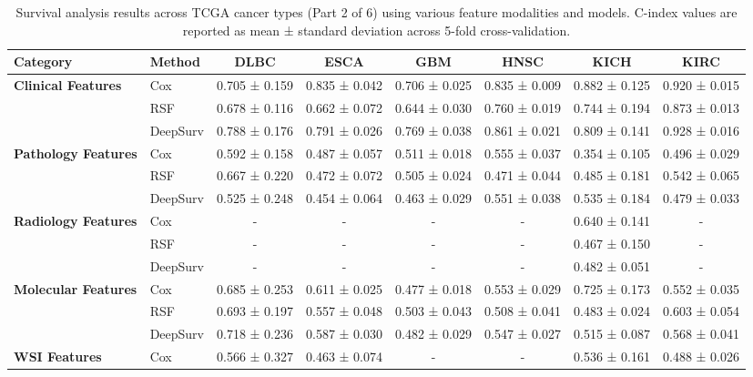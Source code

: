 \begin{sidewaystable}[htbp]
    \centering
    \caption{Survival analysis results across TCGA cancer types (Part 2 of 6) using various feature modalities and models. C-index values are reported as mean ± standard deviation across 5-fold cross-validation.}
    \label{tab:survival_results_2}
    \begin{tabular}{@{}llcccccc@{}}
        \toprule
        \textbf{Category} & \textbf{Method} & \textbf{DLBC} & \textbf{ESCA} & \textbf{GBM} & \textbf{HNSC} & \textbf{KICH} & \textbf{KIRC} \\
        \midrule
        \multirow{3}{*}{\textbf{Clinical Features}} & Cox & 0.705 ± 0.159 & 0.835 ± 0.042 & 0.706 ± 0.025 & 0.835 ± 0.009 & 0.882 ± 0.125 & 0.920 ± 0.015 \\
        & RSF & 0.678 ± 0.116 & 0.662 ± 0.072 & 0.644 ± 0.030 & 0.760 ± 0.019 & 0.744 ± 0.194 & 0.873 ± 0.013 \\
        & DeepSurv & 0.788 ± 0.176 & 0.791 ± 0.026 & 0.769 ± 0.038 & 0.861 ± 0.021 & 0.809 ± 0.141 & 0.928 ± 0.016 \\
        \midrule
        \multirow{3}{*}{\textbf{Pathology Features}} & Cox & 0.592 ± 0.158 & 0.487 ± 0.057 & 0.511 ± 0.018 & 0.555 ± 0.037 & 0.354 ± 0.105 & 0.496 ± 0.029 \\
        & RSF & 0.667 ± 0.220 & 0.472 ± 0.072 & 0.505 ± 0.024 & 0.471 ± 0.044 & 0.485 ± 0.181 & 0.542 ± 0.065 \\
        & DeepSurv & 0.525 ± 0.248 & 0.454 ± 0.064 & 0.463 ± 0.029 & 0.551 ± 0.038 & 0.535 ± 0.184 & 0.479 ± 0.033 \\
        \midrule
        \multirow{3}{*}{\textbf{Radiology Features}} & Cox & - & - & - & - & 0.640 ± 0.141 & - \\
        & RSF & - & - & - & - & 0.467 ± 0.150 & - \\
        & DeepSurv & - & - & - & - & 0.482 ± 0.051 & - \\
        \midrule
        \multirow{3}{*}{\textbf{Molecular Features}} & Cox & 0.685 ± 0.253 & 0.611 ± 0.025 & 0.477 ± 0.018 & 0.553 ± 0.029 & 0.725 ± 0.173 & 0.552 ± 0.035 \\
        & RSF & 0.693 ± 0.197 & 0.557 ± 0.048 & 0.503 ± 0.043 & 0.508 ± 0.041 & 0.483 ± 0.024 & 0.603 ± 0.054 \\
        & DeepSurv & 0.718 ± 0.236 & 0.587 ± 0.030 & 0.482 ± 0.029 & 0.547 ± 0.027 & 0.515 ± 0.087 & 0.568 ± 0.041 \\
        \midrule
        \multirow{3}{*}{\textbf{WSI Features}} & Cox & 0.566 ± 0.327 & 0.463 ± 0.074 & - & - & 0.536 ± 0.161 & 0.488 ± 0.026 \\

\end{tabular}
\end{sidewaystable}
